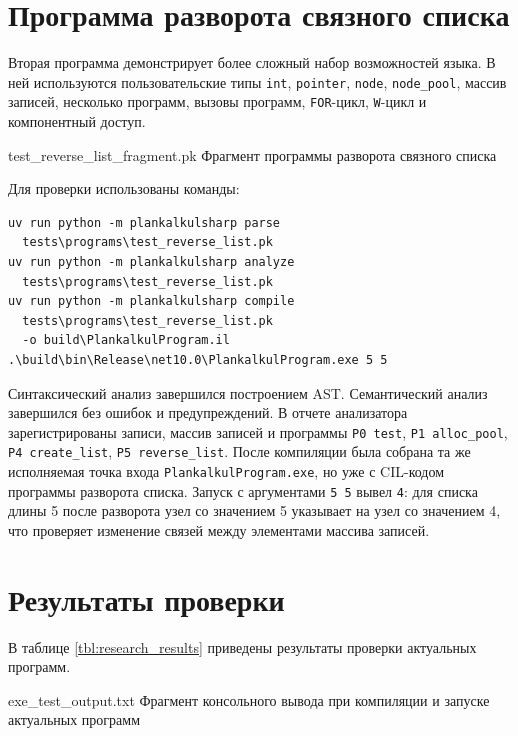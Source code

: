 \section{Программа разворота связного списка}
Вторая программа демонстрирует более сложный набор возможностей языка.
В ней используются пользовательские типы \texttt{int}, \texttt{pointer}, \texttt{node}, \texttt{node\_pool}, массив записей, несколько программ, вызовы программ, \texttt{FOR}-цикл, \texttt{W}-цикл и компонентный доступ.

{test_reverse_list_fragment.pk}
{Фрагмент программы разворота связного списка}

Для проверки использованы команды:
\begin{verbatim}
uv run python -m plankalkulsharp parse
  tests\programs\test_reverse_list.pk
uv run python -m plankalkulsharp analyze
  tests\programs\test_reverse_list.pk
uv run python -m plankalkulsharp compile
  tests\programs\test_reverse_list.pk
  -o build\PlankalkulProgram.il
.\build\bin\Release\net10.0\PlankalkulProgram.exe 5 5
\end{verbatim}

Синтаксический анализ завершился построением AST.
Семантический анализ завершился без ошибок и предупреждений.
В отчете анализатора зарегистрированы записи, массив записей и программы \texttt{P0 test}, \texttt{P1 alloc\_pool}, \texttt{P4 create\_list}, \texttt{P5 reverse\_list}.
После компиляции была собрана та же исполняемая точка входа \texttt{PlankalkulProgram.exe}, но уже с CIL-кодом программы разворота списка.
Запуск с аргументами \texttt{5 5} вывел \texttt{4}: для списка длины 5 после разворота узел со значением 5 указывает на узел со значением 4, что проверяет изменение связей между элементами массива записей.

\section{Результаты проверки}
В таблице \ref{tbl:research_results} приведены результаты проверки актуальных программ.

{exe_test_output.txt}
{Фрагмент консольного вывода при компиляции и запуске актуальных программ}

